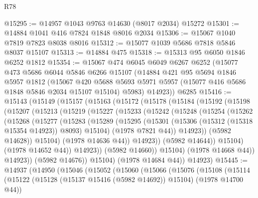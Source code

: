 \begin{lexlean}{R78}
\begin{coremodule}
@15295 := @14957 @1043 @9763 @14630 (@8017 @2034) @15272
@15301 := @14884 @1041 @416 @7824 @1848 @8016 @2034
@15306 := @15067 @1040 @7819 @7823 @8038 @8016
@15312 := @15077 @1039 @5686 @7818 @5846 @8037 @15107
@15313 := @14884 @475
@15318 := @15313 @95 @6050 @1846 @6252 @1812
@15354 := @15067
    @474
    @6045
    @6049
    @6267
    @6252
    (@15077
      @473
      @5686
      @6044
      @5846
      @6266
      @15107
      (@14884
        @421
        @95
        @5694
        @1846
        @5957
        @1812
        (@15067
          @420
          @5688
          @5693
          @5971
          @5957
          (@15077 @416 @5686 @1848 @5846 @2034 @15107 @15104)
          @5983)
        @14923))
    @6285
@15416 := @15143
    (@15149
      (@15157
        (@15163
          (@15172
            (@15178
              (@15184
                (@15192
                  (@15198
                    (@15207
                      (@15213
                        (@15219
                          (@15227
                            (@15233
                              (@15242
                                (@15248
                                  (@15254
                                    (@15262
                                      (@15268
                                        (@15277
                                          (@15283
                                            (@15289
                                              (@15295
                                                (@15301
                                                  (@15306 (@15312 (@15318 @15354 @14923)) @8093)
                                                  @15104)
                                                (@1978 @7821 @44))
                                              @14923))
                                          (@5982 @14628))
                                        @15104)
                                      (@1978 @14636 @44))
                                    @14923))
                                (@5982 @14644))
                              @15104)
                            (@1978 @14652 @44))
                          @14923))
                      (@5982 @14660))
                    @15104)
                  (@1978 @14668 @44))
                @14923))
            (@5982 @14676))
          @15104)
        (@1978 @14684 @44))
      @14923)
@15445 := @14937
    (@14950
      (@15046
        (@15052
          (@15060
            (@15066
              (@15076
                (@15108
                  (@15114
                    (@15122 (@15128 (@15137 @15416 (@5982 @14692)) @15104) (@1978 @14700 @44))

\end{coremodule}
\end{lexlean}
